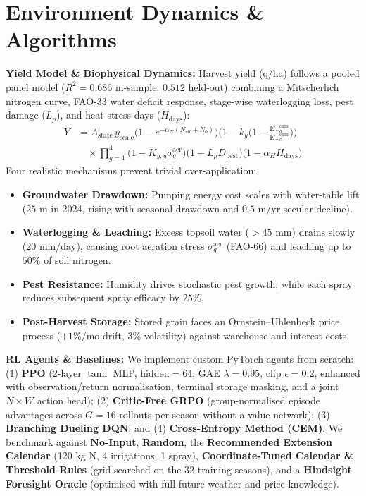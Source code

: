 \documentclass[10pt,twocolumn]{article}
\begin{document}
\section{Environment Dynamics \& Algorithms}
\textbf{Yield Model \& Biophysical Dynamics:} Harvest yield (q/ha) follows a pooled panel model ($R^2 = 0.686$ in-sample, $0.512$ held-out) combining a Mitscherlich nitrogen curve, FAO-33 water deficit response, stage-wise waterlogging loss, pest damage ($L_p$), and heat-stress days ($H_{\text{days}}$):
\begin{equation}
\begin{aligned}
Y &= A_{\text{state}}\, y_{\text{scale}} \big(1 - e^{-\alpha_N (N_{\text{eff}} + N_0)}\big) \Big(1 - k_y\Big(1 - \tfrac{\text{ET}^{\text{cum}}_a}{\text{ET}^{\text{cum}}_c}\Big)\Big) \\
&\quad \times \prod_{g=1}^{4}\big(1 - K_{y,g}\bar{\sigma}^{\text{aer}}_g\big) \big(1 - L_p D_{\text{pest}}\big) \big(1 - \alpha_H H_{\text{days}}\big)
\end{aligned}
\end{equation}
Four realistic mechanisms prevent trivial over-application:
\begin{itemize}
    \item \textbf{Groundwater Drawdown:} Pumping energy cost scales with water-table lift ($25\text{ m}$ in 2024, rising with seasonal drawdown and $0.5\text{ m/yr}$ secular decline).
    \item \textbf{Waterlogging \& Leaching:} Excess topsoil water ($>45\text{ mm}$) drains slowly ($20\text{ mm/day}$), causing root aeration stress $\sigma^{\text{aer}}_g$ (FAO-66) and leaching up to $50\%$ of soil nitrogen.
    \item \textbf{Pest Resistance:} Humidity drives stochastic pest growth, while each spray reduces subsequent spray efficacy by $25\%$.
    \item \textbf{Post-Harvest Storage:} Stored grain faces an Ornstein--Uhlenbeck price process ($+1\%/\text{mo}$ drift, $3\%$ volatility) against warehouse and interest costs.
\end{itemize}

\textbf{RL Agents \& Baselines:} We implement custom PyTorch agents from scratch: (1) \textbf{PPO} (2-layer $\tanh$ MLP, $\text{hidden}=64$, GAE $\lambda=0.95$, clip $\epsilon=0.2$, enhanced with observation/return normalisation, terminal storage masking, and a joint $N\times W$ action head); (2) \textbf{Critic-Free GRPO} (group-normalised episode advantages across $G=16$ rollouts per season without a value network); (3) \textbf{Branching Dueling DQN}; and (4) \textbf{Cross-Entropy Method (CEM)}. We benchmark against \textbf{No-Input}, \textbf{Random}, the \textbf{Recommended Extension Calendar} (120 kg N, 4 irrigations, 1 spray), \textbf{Coordinate-Tuned Calendar \& Threshold Rules} (grid-searched on the 32 training seasons), and a \textbf{Hindsight Foresight Oracle} (optimised with full future weather and price knowledge).
\end{document}

